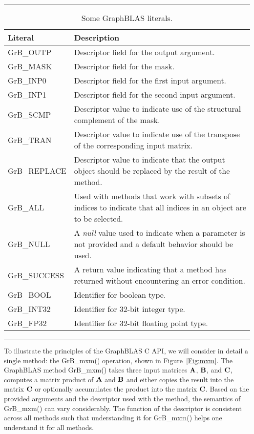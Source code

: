 \begin{table}[h]
\hrule
\begin{center}
\caption{Some GraphBLAS literals.}
\label{Tab:GrBliterals}
\begin{tabular}{lp{5.9cm}}
Literal                 & Description  \\
\hline
	{\sf GrB\_OUTP}      & Descriptor field for the output argument. \\
	{\sf GrB\_MASK}      & Descriptor field for the mask. \\
	{\sf GrB\_INP0}      & Descriptor field for the first input argument. \\
	{\sf GrB\_INP1}      & Descriptor field for the second input argument. \\ 
	{\sf GrB\_SCMP}      & Descriptor value to indicate use of the structural complement of the mask. \\
	{\sf GrB\_TRAN}      & Descriptor value to indicate use of the transpose of the corresponding input matrix. \\
	{\sf GrB\_REPLACE}   & Descriptor value to indicate that the output object should be replaced by the result of the method. \\ 
	{\sf GrB\_ALL}       & Used with methods that work with subsets of indices to indicate that all indices in an object are to be selected. \\
	{\sf GrB\_NULL}      & A \emph{null} value used to indicate when a parameter is not provided and a default behavior should be used. \\
	{\sf GrB\_SUCCESS}   & A return value indicating that a method has returned without encountering an error condition. \\
	{\sf GrB\_BOOL}		   & Identifier for boolean type. \\
	{\sf GrB\_INT32}	   & Identifier for 32-bit integer type. \\
	{\sf GrB\_FP32}		   & Identifier for 32-bit floating point type. \\
\end{tabular}
\end{center}
\hrule
\end{table}

To illustrate the principles of the GraphBLAS C API, we
will consider in detail a single method: the {\sf GrB\_mxm()} operation, shown in Figure~\ref{Fig:mxm}.
The GraphBLAS method {\sf GrB\_mxm()} takes three input matrices ${\bf A}$, ${\bf B}$, and ${\bf C}$, 
computes a matrix product of ${\bf A}$ and ${\bf B}$ and either copies the result into the matrix ${\bf C}$
or optionally accumulates the product into the matrix ${\bf C}$.  Based on the provided arguments 
and the descriptor used with the method, the semantics of {\sf GrB\_mxm()} can vary considerably.
The function of the descriptor is consistent across all methods such that understanding it for
{\sf GrB\_mxm()} helps one understand it for all methods.

